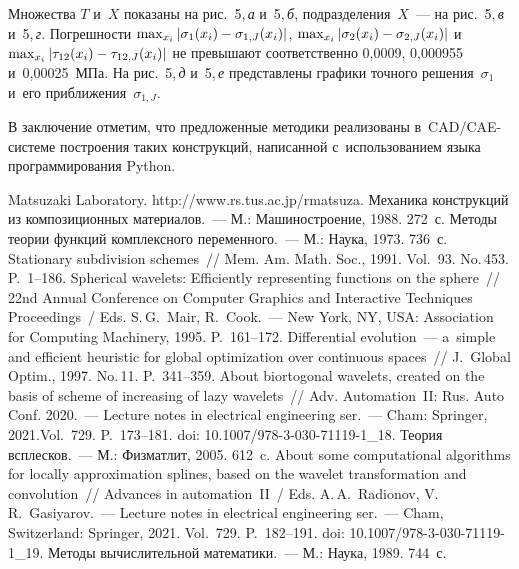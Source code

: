 \begin{multicols}{2}
  Множества $T$ и~$X$ показаны на рис.~5,\,\textit{а} и~5,\,\textit{б}, 
подразделения~$X$~--- на рис.~5,\,\textit{в} и~5,\,\textit{г}. Погрешности 
$\max_{x_i}\vert \sigma_1(x_i) \hm- \sigma_{1,J}(x_i)\vert$, $\max_{x_i}\vert 
\sigma_2(x_i)\hm- \sigma_{2,J}(x_i)\vert$ и~$\max_{x_i}\vert \tau_{12}(x_i)\hm- 
\tau_{12,J} (x_i)\vert$ не превышают соответственно 0,0009, 0,000955 
и~0,00025~МПа. На рис.~5,\,\textit{д} и~5,\,\textit{е} пред\-став\-ле\-ны графики точ\-но\-го 
решения~$\sigma_1$  и~его при\-бли\-же\-ния~$\sigma_{1,J}$.
  


  
  В заключение отметим, что предложенные методики реализованы  
в~CAD/CAE-сис\-те\-ме по\-стро\-ения таких конструкций, написанной 
с~использованием языка программирования Python.
  
{\small\frenchspacing
 {%
 \begin{thebibliography}{99}
Matsuzaki Laboratory. {\sf http://www.rs.tus.ac.jp/\linebreak rmatsuza}.
 Механика конструкций из композиционных материалов.~--- 
М.: Машиностроение, 1988. 272~с.
 Методы тео\-рии функций комплексного 
переменного.~--- М.: Наука, 1973. 736~с.
 Stationary subdivision 
schemes~// Mem. Am. Math. Soc., 1991. Vol.~93. No.\,453. P.~1--186.
 Spherical wavelets: Efficiently representing functions 
on the sphere~// 22nd Annual Conference on Computer Graphics and Interactive 
Techniques Proceedings~/ Eds. S.\,G.~Mair, R.~Cook.~---
New York, NY, USA: Association for Computing Machinery, 1995. P.~161--172.
 Differential evolution~--- a~simple and efficient heuristic for 
global optimization over continuous spaces~// J.~Global Optim., 1997. No.\,11. 
P.~341--359.
 About biortogonal wavelets, 
created on the basis of scheme of increasing of lazy wavelets~// Adv.  Automation~II: 
Rus. Auto Conf. 2020.~--- Lecture notes in electrical engineering ser.~--- Cham: 
Springer, 2021.Vol.~729. P.~173--181. doi: 10.1007/978-3-030-71119-1\_18.
 Тео\-рия всплес\-ков.~--- М.: 
Физматлит, 2005. 612~c.
 About some computational 
algorithms for locally approximation splines, based on the wavelet transformation and 
convolution~// Advances in automation~II~/
Eds. A.\,A.~Radionov, V.\,R.~Gasiyarov.~--- Lecture notes in 
electrical engineering ser.~--- Cham, Switzerland: Springer, 2021. Vol.~729. P.~182--191. doi: 
10.1007/978-3-030-71119-1\_19.
 Методы вы\-чис\-ли\-тель\-ной математики.~--- М.: Наука, 1989. 744~с.

\end{thebibliography}

 }
 }

\end{multicols}

